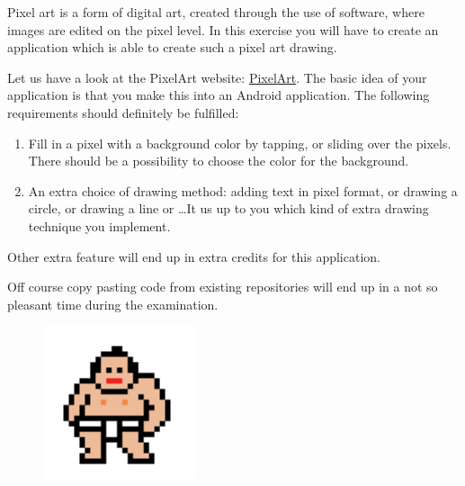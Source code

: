 \begin{exercise}
	Pixel art is a form of digital art, created through the use of software, where images are edited on the pixel level. In this exercise you will have to create an application which is able to create such a pixel art drawing. 
	
	Let us have a look at the PixelArt website: \href{https://www.pixilart.com/draw}{PixelArt}. The basic idea of your application is that you make this into an Android application. The following requirements should definitely be fulfilled:
	\begin{enumerate}
		\item Fill in a pixel with a background color by tapping, or sliding over the pixels. There should be a possibility to choose the color for the background.
		\item An extra choice of drawing method: adding text in pixel format, or drawing a circle, or drawing a line or \dots It us up to you which kind of extra drawing technique you implement.
	\end{enumerate}
	Other extra feature will end up in extra credits for this application. 
	
	Off course copy pasting code from existing repositories will end up in a not so pleasant time during the examination.
	
	\label{ex:dotpict}
\end{exercise}
	\begin{figure}[b]
		\centering
	\includegraphics[width=0.4\textwidth]{images/ui/pixelart}
\end{figure}

